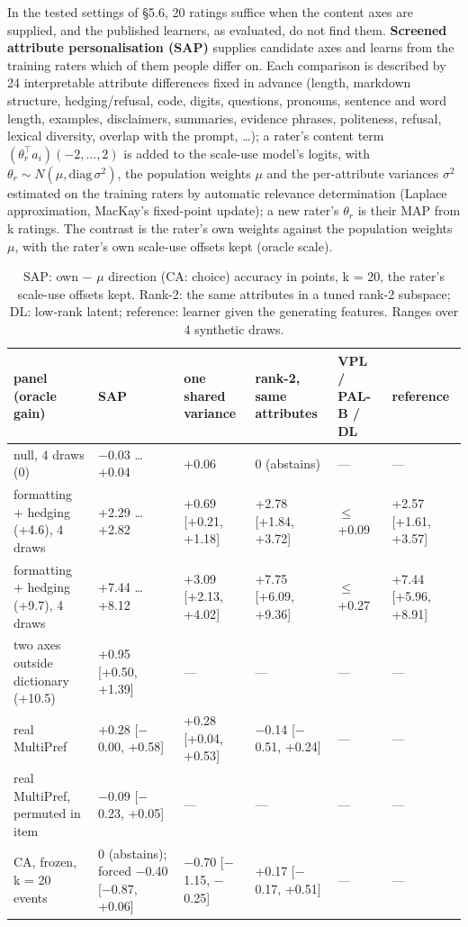 \documentclass{article}
\begin{document}
In the tested settings of \S{}5.6, 20 ratings suffice when the content axes are supplied, and the published learners, as evaluated, do not find them. \textbf{Screened attribute personalisation (SAP)} supplies candidate axes and learns from the training raters which of them people differ on. Each comparison is described by 24 interpretable attribute differences fixed in advance (length, markdown structure, hedging/refusal, code, digits, questions, pronouns, sentence and word length, examples, disclaimers, summaries, evidence phrases, politeness, refusal, lexical diversity, overlap with the prompt, \ldots); a rater's content term \((\theta_r^\top a_i)(-2,\dots,2)\) is added to the scale-use model's logits, with \(\theta_r \sim N(\mu, \mathrm{diag}\,\sigma^2)\), the population weights \(\mu\) and the per-attribute variances \(\sigma^2\) estimated on the training raters by automatic relevance determination (Laplace approximation, MacKay's fixed-point update); a new rater's \(\theta_r\) is their MAP from k ratings. The contrast is the rater's own weights against the population weights \(\mu\), with the rater's own scale-use offsets kept (oracle scale).

\begin{table}[t]\centering\caption{SAP: own $-$ $\mu$ direction (CA: choice) accuracy in points, k = 20, the rater's scale-use offsets kept. Rank-2: the same attributes in a tuned rank-2 subspace; DL: low-rank latent; reference: learner given the generating features. Ranges over 4 synthetic draws.}\scriptsize\setlength{\tabcolsep}{3pt}\begin{tabular}{@{}
  l
  l
  l
  l
  l
  l@{}}
\toprule\noalign{}
panel (oracle gain) & SAP & one shared variance & rank-2, same attributes & VPL / PAL-B / DL & reference \\
\midrule\noalign{}



null, 4 draws (0) & $-$0.03 \ldots{} +0.04 & +0.06 & 0 (abstains) & --- & --- \\
formatting + hedging (+4.6), 4 draws & +2.29 \ldots{} +2.82 & +0.69 {[}+0.21, +1.18{]} & +2.78 {[}+1.84, +3.72{]} & $\leq$ +0.09 & +2.57 {[}+1.61, +3.57{]} \\
formatting + hedging (+9.7), 4 draws & +7.44 \ldots{} +8.12 & +3.09 {[}+2.13, +4.02{]} & +7.75 {[}+6.09, +9.36{]} & $\leq$ +0.27 & +7.44 {[}+5.96, +8.91{]} \\
two axes outside dictionary (+10.5) & +0.95 {[}+0.50, +1.39{]} & --- & --- & --- & --- \\
real MultiPref & +0.28 {[}$-$0.00, +0.58{]} & +0.28 {[}+0.04, +0.53{]} & $-$0.14 {[}$-$0.51, +0.24{]} & --- & --- \\
real MultiPref, permuted in item & $-$0.09 {[}$-$0.23, +0.05{]} & --- & --- & --- & --- \\
CA, frozen, k = 20 events & 0 (abstains); forced $-$0.40 {[}$-$0.87, +0.06{]} & $-$0.70 {[}$-$1.15, $-$0.25{]} & +0.17 {[}$-$0.17, +0.51{]} & --- & --- \\
\bottomrule
\end{tabular}\end{table}
\end{document}
